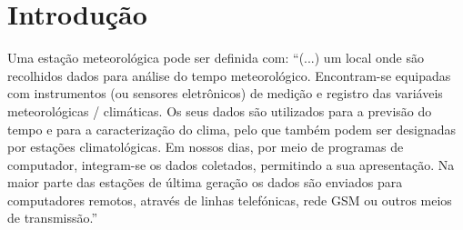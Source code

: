 \documentclass[twocolumn,11pt]{article}
\begin{document}
\section{Introdução}\label{introducao}
Uma estação meteorológica pode ser definida com:
“(...) um local onde são recolhidos dados para análise do tempo meteorológico. Encontram-se equipadas com instrumentos (ou sensores eletrônicos) de medição e registro das variáveis meteorológicas / climáticas. Os seus dados são utilizados para a previsão do tempo e para a caracterização do clima, pelo que também podem ser designadas por estações climatológicas. Em nossos dias, por meio de programas de computador, integram-se os dados coletados, permitindo a sua apresentação. Na maior parte das estações de última geração os dados são enviados para computadores remotos, através de linhas telefónicas, rede GSM ou outros meios de transmissão.” \cite{wikiestacao}
\end{document}
